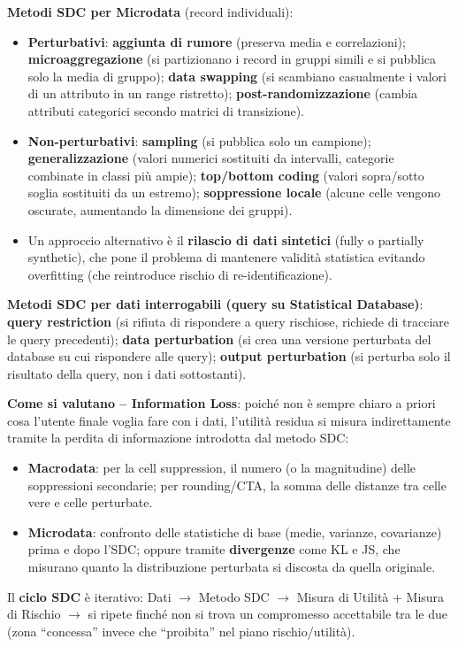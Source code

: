 \documentclass[a4paper,11pt]{article}
\begin{document}
\textbf{Metodi SDC per Microdata} (record individuali):
\begin{itemize}
  \item \textbf{Perturbativi}: \textbf{aggiunta di rumore} (preserva media e correlazioni); \textbf{microaggregazione} (si partizionano i record in gruppi simili e si pubblica solo la media di gruppo); \textbf{data swapping} (si scambiano casualmente i valori di un attributo in un range ristretto); \textbf{post-randomizzazione} (cambia attributi categorici secondo matrici di transizione).
  \item \textbf{Non-perturbativi}: \textbf{sampling} (si pubblica solo un campione); \textbf{generalizzazione} (valori numerici sostituiti da intervalli, categorie combinate in classi pi\`{u} ampie); \textbf{top/bottom coding} (valori sopra/sotto soglia sostituiti da un estremo); \textbf{soppressione locale} (alcune celle vengono oscurate, aumentando la dimensione dei gruppi).
  \item Un approccio alternativo \`{e} il \textbf{rilascio di dati sintetici} (fully o partially synthetic), che pone il problema di mantenere validit\`{a} statistica evitando overfitting (che reintroduce rischio di re-identificazione).
\end{itemize}

\textbf{Metodi SDC per dati interrogabili (query su Statistical Database)}: \textbf{query restriction} (si rifiuta di rispondere a query rischiose, richiede di tracciare le query precedenti); \textbf{data perturbation} (si crea una versione perturbata del database su cui rispondere alle query); \textbf{output perturbation} (si perturba solo il risultato della query, non i dati sottostanti).

\textbf{Come si valutano -- Information Loss}: poich\'{e} non \`{e} sempre chiaro a priori cosa l'utente finale voglia fare con i dati, l'utilit\`{a} residua si misura indirettamente tramite la perdita di informazione introdotta dal metodo SDC:
\begin{itemize}
  \item \textbf{Macrodata}: per la cell suppression, il numero (o la magnitudine) delle soppressioni secondarie; per rounding/CTA, la somma delle distanze tra celle vere e celle perturbate.
  \item \textbf{Microdata}: confronto delle statistiche di base (medie, varianze, covarianze) prima e dopo l'SDC; oppure tramite \textbf{divergenze} come KL e JS, che misurano quanto la distribuzione perturbata si discosta da quella originale.
\end{itemize}
Il \textbf{ciclo SDC} \`{e} iterativo: Dati $\to$ Metodo SDC $\to$ Misura di Utilit\`{a} + Misura di Rischio $\to$ si ripete finch\'{e} non si trova un compromesso accettabile tra le due (zona ``concessa'' invece che ``proibita'' nel piano rischio/utilit\`{a}).
\end{document}
